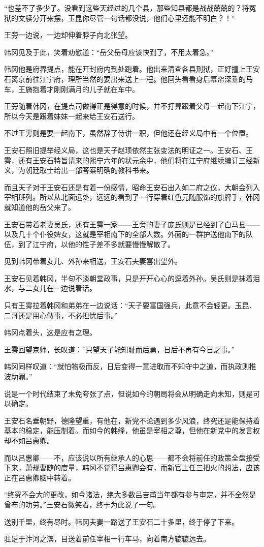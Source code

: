 “也差不了多少了。没看到这些天经过的几个县，那些知县都是战战兢兢的？将冤狱的文牍分开来摆，玉昆你尽管一句话都没说，他们心里还能不明白？！”

王旁一边说，一边却伸着脖子向北张望。

韩冈见及于此，笑着劝慰道：“岳父岳母应该快到了，不用太着急。”

韩冈他是府界提点，能在开封府内到处跑着。他出来清查各县刑狱，正好撞上王安石离京前往江宁府，理所当然的要出来送上一程。他回头看看身后幕帘深垂的马车，王旖抱着才刚刚满月的儿子就在车中。

王旁随着韩冈，在提点司做得正是得意的时候，并不打算跟着父母一起南下江宁，所以今天是跟着妹妹一起来给王安石送行。

不过王雱则是要一起南下，虽然辞了侍讲一职，但他还在经义局中有一个位置。

王安石照旧提举经义局，这也是天子赵顼依然主张变法的明证之一。王安石、王雱，还有王安石特旨请来的熙宁六年的状元余中，他们将在江宁府继续编订三经新义，为朝廷取士给出一部答案明确的教科书来。

而且天子对于王安石还是有着一份感情，昭命王安石出入如二府之仪，大朝会列入宰相班列。所以从北面远处，远远的看到了一行穿着红色元随服饰的旗牌手，韩冈就知道他的岳父来了。

王安石带着老妻吴氏，还有王雱一家——王旁的妻子庞氏则是已经到了白马县——以及几十个仆役婢女，这就是宰相南下的全部人数。外面的一群护送他南下的队伍，到了江宁府，以他的性子差不多就要慢慢解散了。

见到韩冈带着女儿、外孙来相送，王安石夫妻喜出望外。

王安石见着韩冈，半句不谈朝堂政事，只是开开心心的逗着外孙。吴氏则是抹着泪水，与二女儿在一边说着话。

只有王雱拉着韩冈和弟弟在一边说话：“天子要富国强兵，此意不会轻更。玉昆、二哥还是用心做事，不必担忧后事。”

韩冈点着头，这是应有之理。

王雱回望京师，长叹道：“只望天子能知耻而后勇，日后不再有今日之事。”

韩冈同样叹道：“就怕物极而反，日后变得一意进取而不知守中之道，而执政则推波助澜。”

说是一个时代结束了未免夸张了点，但说如今的朝局将会从明确走向未知，则是可以确定。

王安石名垂朝野，德隆望重，有他在，新党不论遇到多少风浪，终究还是能保持着基本的稳定，能压制着。而如今的韩绛，他虽是宰相之尊，但他在新党中的发言权却不如吕惠卿。

而以吕惠卿——不，应该说以所有继承人的心思——都不会将前任的政策全盘接受下来，萧规曹随的度量，韩冈不觉得吕惠卿会有，而新官上任三把火的想法，应该正在吕惠卿脑中转着。

“终究不会大的更改，如今诸法，绝大多数吕吉甫当年都有参与审定，并不全然是曾布的功劳。”王安石微笑着，终于为此说了一句。

送别千里，终有尽时。韩冈夫妻一路送了王安石二十多里，终于停了下来。

驻足于汴河之滨，目送着前任宰相一行车马，向着南方辘辘远去。

